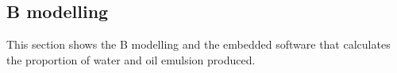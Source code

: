 % 
% 
% 
% 

\subsection{B modelling} 
\label{sec:Bmodel_case_study}

%
 


This section shows the B modelling and the embedded software that calculates the
proportion of water and oil emulsion produced.

